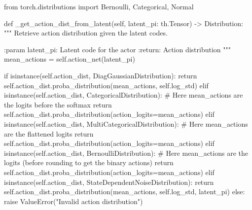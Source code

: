 \documentclass[
  letterpaper,
  DIV=11,
  numbers=noendperiod]{scrartcl}
\newenvironment{Shaded}{\begin{snugshade}}{\end{snugshade}}
\newcommand{\BuiltInTok}[1]{\textcolor[rgb]{0.00,0.23,0.31}{#1}}
\newcommand{\CommentTok}[1]{\textcolor[rgb]{0.37,0.37,0.37}{#1}}
\newcommand{\ControlFlowTok}[1]{\textcolor[rgb]{0.00,0.23,0.31}{#1}}
\newcommand{\ImportTok}[1]{\textcolor[rgb]{0.00,0.46,0.62}{#1}}
\newcommand{\KeywordTok}[1]{\textcolor[rgb]{0.00,0.23,0.31}{#1}}
\newcommand{\NormalTok}[1]{\textcolor[rgb]{0.00,0.23,0.31}{#1}}
\newcommand{\OperatorTok}[1]{\textcolor[rgb]{0.37,0.37,0.37}{#1}}
\newcommand{\PreprocessorTok}[1]{\textcolor[rgb]{0.68,0.00,0.00}{#1}}
\newcommand{\StringTok}[1]{\textcolor[rgb]{0.13,0.47,0.30}{#1}}
\newcommand{\VariableTok}[1]{\textcolor[rgb]{0.07,0.07,0.07}{#1}}
\begin{document}
\begin{Shaded}
\begin{Highlighting}[]
\ImportTok{from}\NormalTok{ torch.distributions }\ImportTok{import}\NormalTok{ Bernoulli, Categorical, Normal}
\end{Highlighting}
\end{Shaded}

\begin{Shaded}
\begin{Highlighting}[]
  \KeywordTok{def}\NormalTok{ \_get\_action\_dist\_from\_latent(}\VariableTok{self}\NormalTok{, latent\_pi: th.Tensor) }\OperatorTok{{-}\textgreater{}}\NormalTok{ Distribution:}
      \CommentTok{"""}
\CommentTok{      Retrieve action distribution given the latent codes.}

\CommentTok{      :param latent\_pi: Latent code for the actor}
\CommentTok{      :return: Action distribution}
\CommentTok{      """}
\NormalTok{      mean\_actions }\OperatorTok{=} \VariableTok{self}\NormalTok{.action\_net(latent\_pi)}

      \ControlFlowTok{if} \BuiltInTok{isinstance}\NormalTok{(}\VariableTok{self}\NormalTok{.action\_dist, DiagGaussianDistribution):}
          \ControlFlowTok{return} \VariableTok{self}\NormalTok{.action\_dist.proba\_distribution(mean\_actions, }\VariableTok{self}\NormalTok{.log\_std)}
      \ControlFlowTok{elif} \BuiltInTok{isinstance}\NormalTok{(}\VariableTok{self}\NormalTok{.action\_dist, CategoricalDistribution):}
          \CommentTok{\# Here mean\_actions are the logits before the softmax}
          \ControlFlowTok{return} \VariableTok{self}\NormalTok{.action\_dist.proba\_distribution(action\_logits}\OperatorTok{=}\NormalTok{mean\_actions)}
      \ControlFlowTok{elif} \BuiltInTok{isinstance}\NormalTok{(}\VariableTok{self}\NormalTok{.action\_dist, MultiCategoricalDistribution):}
          \CommentTok{\# Here mean\_actions are the flattened logits}
          \ControlFlowTok{return} \VariableTok{self}\NormalTok{.action\_dist.proba\_distribution(action\_logits}\OperatorTok{=}\NormalTok{mean\_actions)}
      \ControlFlowTok{elif} \BuiltInTok{isinstance}\NormalTok{(}\VariableTok{self}\NormalTok{.action\_dist, BernoulliDistribution):}
          \CommentTok{\# Here mean\_actions are the logits (before rounding to get the binary actions)}
          \ControlFlowTok{return} \VariableTok{self}\NormalTok{.action\_dist.proba\_distribution(action\_logits}\OperatorTok{=}\NormalTok{mean\_actions)}
      \ControlFlowTok{elif} \BuiltInTok{isinstance}\NormalTok{(}\VariableTok{self}\NormalTok{.action\_dist, StateDependentNoiseDistribution):}
          \ControlFlowTok{return} \VariableTok{self}\NormalTok{.action\_dist.proba\_distribution(mean\_actions, }\VariableTok{self}\NormalTok{.log\_std, latent\_pi)}
      \ControlFlowTok{else}\NormalTok{:}
          \ControlFlowTok{raise} \PreprocessorTok{ValueError}\NormalTok{(}\StringTok{"Invalid action distribution"}\NormalTok{)}
\end{Highlighting}
\end{Shaded}
\end{document}
